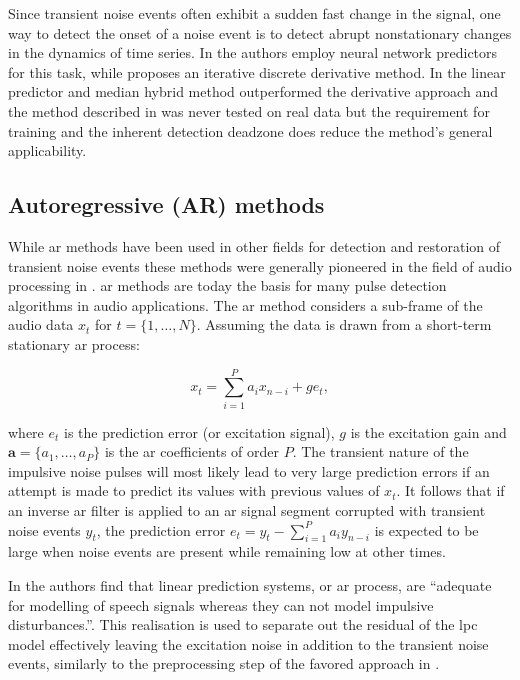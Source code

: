 Since transient noise events often exhibit a sudden fast change in the signal, one way to detect the onset of a noise event is to detect abrupt nonstationary changes in the dynamics of time series. In \cite{Fancourt2000} the authors employ neural network predictors for this task, while \cite{Kauppinen2002} proposes an iterative discrete derivative method. In \cite{Kauppinen2002} the linear predictor and median hybrid method outperformed the derivative approach and the method described in \cite{Fancourt2000} was never tested on real data but the requirement for training and the inherent detection deadzone does reduce the method's general applicability.

\subsection{Autoregressive (AR) methods}\label{sec:LitRevAR}
While \gls{ar} methods have been used in other fields for detection and restoration of transient noise events \cite{Arakawa1986} these methods were generally pioneered in the field of audio processing in \cite{Vaseghi1988thesis}\cite{Vaseghi1988}\cite{Vaseghi1990}. \gls{ar} methods are today the basis for many pulse detection algorithms in audio applications\cite{Karjalainen1997}\cite{Esquef2000}\cite{Haermae2000}\cite{Esquef2002}\cite{Kauppinen2002}\cite{Wolfe2005}\cite{Subramanya2007}. The \gls{ar} method considers a sub-frame of the audio data $x_t$ for $ t = \{ 1, \ldots, N \}$. Assuming the data is drawn from a short-term stationary \gls{ar} process:

\begin{equation}\label{eq:ARmodel}
x_t = \sum_{i=1}^P a_i x_{n-i} + ge_t,
\end{equation}

where $e_t$ is the prediction error (or excitation signal), $g$ is the excitation gain and $\mathbf{a} = \{a_1,\ldots,a_P\}$ is the \gls{ar} coefficients of order $P$. The transient nature of the impulsive noise pulses will most likely lead to very large prediction errors if an attempt is made to predict its values with previous values of $x_t$. It follows that if an inverse \gls{ar} filter is applied to an \gls{ar} signal segment corrupted with transient noise events $y_t$, the prediction error $e_t = y_t - \sum_{i=1}^P a_i y_{n-i}$ is expected to be large when noise events are present while remaining low at other times\cite{Godsill1998book}.

In \cite{Vaseghi1990} the authors find that linear prediction systems, or \gls{ar} process, are ``adequate for modelling of speech signals whereas they can not model impulsive disturbances.''. This realisation is used to separate out the residual of the \gls{lpc} model effectively leaving the excitation noise in addition to the transient noise events, similarly to the preprocessing step of the favored approach in \cite{Kauppinen2002}.

